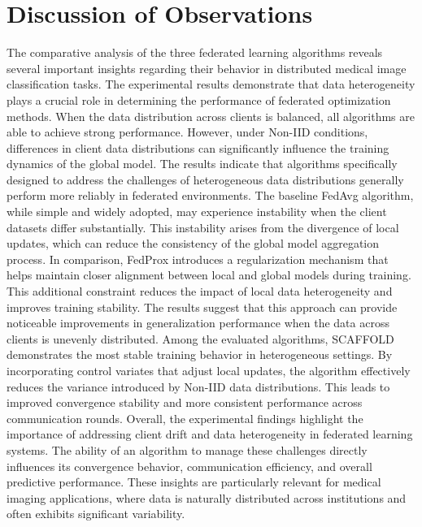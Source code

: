 \documentclass[12pt]{book}
\begin{document}
\section{Discussion of Observations}
The comparative analysis of the three federated learning algorithms reveals several important insights regarding their behavior in distributed medical image classification tasks. The experimental results demonstrate that data heterogeneity plays a crucial role in determining the performance of federated optimization methods. When the data distribution across clients is balanced, all algorithms are able to achieve strong performance. However, under Non-IID conditions, differences in client data distributions can significantly influence the training dynamics of the global model.
The results indicate that algorithms specifically designed to address the challenges of heterogeneous data distributions generally perform more reliably in federated environments. The baseline FedAvg algorithm, while simple and widely adopted, may experience instability when the client datasets differ substantially. This instability arises from the divergence of local updates, which can reduce the consistency of the global model aggregation process.
In comparison, FedProx introduces a regularization mechanism that helps maintain closer alignment between local and global models during training. This additional constraint reduces the impact of local data heterogeneity and improves training stability. The results suggest that this approach can provide noticeable improvements in generalization performance when the data across clients is unevenly distributed.
Among the evaluated algorithms, SCAFFOLD demonstrates the most stable training behavior in heterogeneous settings. By incorporating control variates that adjust local updates, the algorithm effectively reduces the variance introduced by Non-IID data distributions. This leads to improved convergence stability and more consistent performance across communication rounds.
Overall, the experimental findings highlight the importance of addressing client drift and data heterogeneity in federated learning systems. The ability of an algorithm to manage these challenges directly influences its convergence behavior, communication efficiency, and overall predictive performance. These insights are particularly relevant for medical imaging applications, where data is naturally distributed across institutions and often exhibits significant variability.
\end{document}
